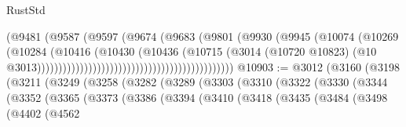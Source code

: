 \begin{lexlean}{RustStd}
\begin{coremodule}
                                                              (@9481
                                                                (@9587
                                                                  (@9597
                                                                    (@9674
                                                                      (@9683
                                                                        (@9801
                                                                          (@9930
                                                                            (@9945
                                                                              (@10074
                                                                                (@10269
                                                                                  (@10284
                                                                                    (@10416
                                                                                      (@10430
                                                                                        (@10436
                                                                                          (@10715
                                                                                            (@3014
                                                                                              (@10720
                                                                                                @10823)
                                                                                              (@10
                                                                                                @3013))))))))))))))))))))))))))))))))))))))))))))))
@10903 := @3012
    (@3160
      (@3198
        (@3211
          (@3249
            (@3258
              (@3282
                (@3289
                  (@3303
                    (@3310
                      (@3322
                        (@3330
                          (@3344
                            (@3352
                              (@3365
                                (@3373
                                  (@3386
                                    (@3394
                                      (@3410
                                        (@3418
                                          (@3435
                                            (@3484
                                              (@3498
                                                (@4402
                                                  (@4562

\end{coremodule}
\end{lexlean}
